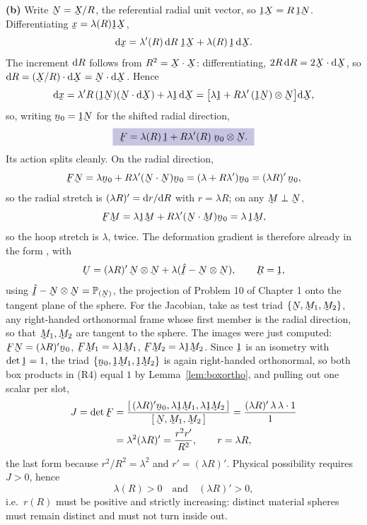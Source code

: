 \begin{solution}
\textbf{(b)} Write $\bN=\bX/R$, the referential radial unit vector, so
$\shift\bX=R\,\shift\bN$. Differentiating $\bx=\lambda(R)\shift\bX$,
\[
   \dl\bx=\lambda'(R)\,\dl R\;\shift\bX+\lambda(R)\,\shift\,\dl\bX .
\]
The increment $\mathrm{d} R$ follows from $R^{2}=\ip\bX\bX$: differentiating,
$2R\,\dl R=2\ip{\bX}{\dl\bX}$, so
$\dl R=\ip{(\bX/R)}{\dl\bX}=\ip{\bN}{\dl\bX}$. Hence
\[
   \dl\bx=\lambda'R\,(\shift\bN)(\ip{\bN}{\dl\bX})+\lambda\shift\,\dl\bX
   =\big[\lambda\shift+R\lambda'\,(\shift\bN)\otimes\bN\big]\dl\bX ,
\]
so, writing $\bn_{0}=\shift\bN$ for the shifted radial direction,
\[
   \boxed{\ \bF=\lambda(R)\,\shift+R\lambda'(R)\;\bn_{0}\otimes\bN .\ }
\]
Its action splits cleanly. On the radial direction,
\[
   \bF\bN=\lambda\bn_{0}+R\lambda'(\ip\bN\bN)\bn_{0}
        =(\lambda+R\lambda')\bn_{0}=(\lambda R)'\,\bn_{0},
\]
so the radial stretch is $(\lambda R)'=\mathrm{d} r/\mathrm{d} R$ with $r=\lambda R$; on
any $\bM\perp\bN$,
\[
   \bF\bM=\lambda\shift\bM+R\lambda'(\ip\bN\bM)\bn_{0}=\lambda\,\shift\bM,
\]
so the hoop stretch is $\lambda$, twice. The deformation gradient is
therefore already in the form , with
\[
   \bU=(\lambda R)'\,\bN\otimes\bN+\lambda(\hI-\bN\otimes\bN),
   \qquad \bR=\shift ,
\]
using $\hI-\bN\otimes\bN=\Proj{\bN}$, the projection of Problem 10 of
Chapter 1 onto the tangent plane of the sphere. For the Jacobian, take as
test triad $\{\bN,\bM_{1},\bM_{2}\}$, any right-handed orthonormal frame
whose first member is the radial direction, so that $\bM_{1},\bM_{2}$ are
tangent to the sphere. The images were just computed:
$\bF\bN=(\lambda R)'\bn_{0}$, $\bF\bM_{1}=\lambda\shift\bM_{1}$,
$\bF\bM_{2}=\lambda\shift\bM_{2}$. Since $\shift$ is an isometry with
$\det\shift=1$, the triad $\{\bn_{0},\shift\bM_{1},\shift\bM_{2}\}$ is
again right-handed orthonormal, so both box products in (R4) equal $1$ by
Lemma~\ref{lem:boxortho}, and pulling out one scalar per slot,
\[
\begin{aligned}
   J=\det\bF
   &=\frac{\tbox{(\lambda R)'\bn_{0}}{\lambda\shift\bM_{1}}
                {\lambda\shift\bM_{2}}}
          {\tbox{\bN}{\bM_{1}}{\bM_{2}}}
    =\frac{(\lambda R)'\,\lambda\,\lambda\cdot 1}{1}\\
   &=\lambda^{2}(\lambda R)'=\frac{r^{2}r'}{R^{2}},\qquad r=\lambda R ,
\end{aligned}
\]
the last form because $r^{2}/R^{2}=\lambda^{2}$ and $r'=(\lambda R)'$.
Physical possibility requires $J>0$, hence
\[
   \lambda(R)>0\quad\text{and}\quad (\lambda R)'>0 ,
\]
i.e.\ $r(R)$ must be positive and strictly increasing: distinct material
spheres must remain distinct and must not turn inside out.


\end{solution}
